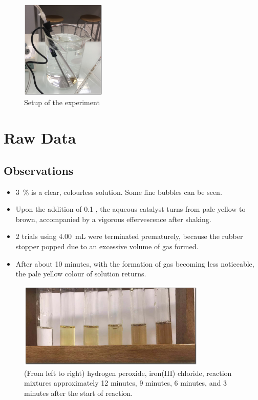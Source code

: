 \documentclass[a4paper, 12pt]{article}
\begin{document}
\begin{figure}[H]
    \centering
    \includegraphics[width=0.36\textwidth]{imgs/setup}
    \caption{Setup of the experiment}
    \label{fig:setup}
\end{figure}


\section*{Raw Data}
\subsection*{Observations}
\begin{itemize}
    \itemsep 0em
    \item \SI{3}{\percent}  is a clear, colourless solution. Some fine bubbles can be seen.
    \item Upon the addition of \SI{0.1}{\molar} , the aqueous catalyst turns from pale yellow to brown, accompanied by a vigorous effervescence after shaking.
    \item 2 trials using \SI{4.00}{\mL}  were terminated prematurely, because the rubber stopper popped due to an excessive volume of gas formed.
    \item After about 10 minutes, with the formation of gas becoming less noticeable, the pale yellow colour of  solution returns.
\end{itemize}

\begin{figure}[H]
    \centering
    \includegraphics[width=0.8\textwidth]{imgs/colours}
    \caption{(From left to right) hydrogen peroxide, iron(III) chloride, reaction mixtures approximately 12 minutes, 9 minutes, 6 minutes, and 3 minutes after the start of reaction. }
    \label{fig:colours}
\end{figure}
\end{document}
